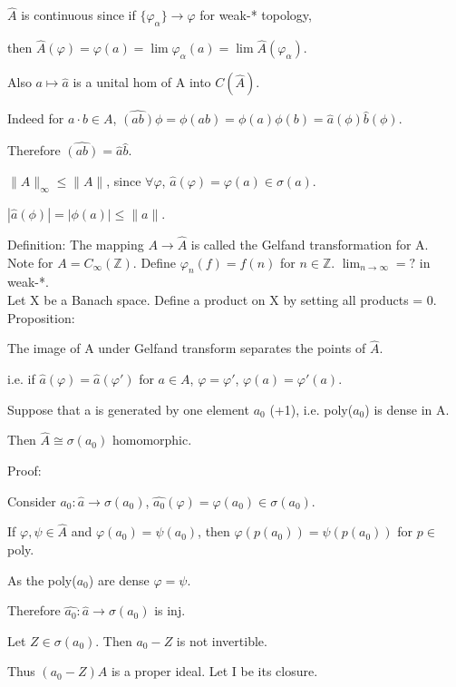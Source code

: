 \documentclass[12pt]{article}
\begin{document}
$\hat{A}$ is continuous since if $\{\varphi_\alpha\} \to \varphi$ for weak-* topology,

then $\hat{A}(\varphi) = \varphi(a) = \lim \varphi_\alpha(a) = \lim \hat{A}(\varphi_\alpha)$.

Also $a \mapsto \hat{a}$ is a unital hom of A into $C(\hat{A})$.

Indeed for $a \cdot b \in A$, $\hat{(ab)} \phi = \phi(ab) = \phi(a)\phi(b) = \hat{a}(\phi)\hat{b}(\phi)$.

Therefore $\hat{(ab)} = \hat{a}\hat{b}$.

$\|\hat{A}\|_\infty \leq \|A\|$, since $\forall \varphi$, $\hat{a}(\varphi) = \varphi(a) \in \sigma(a)$.

$|\hat{a}(\phi)| = |\phi(a)| \leq \|a\|$.

\noindent
Definition: The mapping $A \to \hat{A}$ is called the Gelfand transformation for A.\\

\noindent
Note for $A = C_\infty(\mathds{Z})$.  Define $\varphi_n(f) = f(n)$ for $n \in \mathds{Z}$.  $\lim_{n \to \infty} = ?$ in weak-*.\\

\noindent
Let X be a Banach space.  Define a product on X by setting all products = 0.
\noindent
Proposition:

The image of A under Gelfand transform separates the points of $\hat{A}$.

i.e. if $\hat{a}(\varphi) = \hat{a}(\varphi ')$ for $a \in A$, $\varphi = \varphi '$, $\varphi(a) = \varphi ' (a)$.

\noindent
Suppose that a is generated by one element $a_0$ (+1), i.e. poly($a_0$) is dense in A.

Then $\hat{A} \cong \sigma(a_0)$ homomorphic.

\noindent
Proof:

Consider $\hat{a_0} : \hat{a} \to \sigma(a_0)$, $\hat{a_0}(\varphi) = \varphi(a_0) \in \sigma(a_0)$.

If $\varphi, \psi \in \hat{A}$ and $\varphi(a_0) = \psi(a_0)$, then $\varphi(p(a_0)) = \psi(p(a_0))$ for $p \in $poly.

As the poly($a_0$) are dense $\varphi = \psi$.

Therefore $\hat{a_0}: \hat{a} \to \sigma(a_0)$ is inj.

Let $Z \in \sigma(a_0)$.  Then $a_0 - Z$ is not invertible.

Thus $(a_0 - Z)A$ is a proper ideal.  Let I be its closure.
\end{document}
